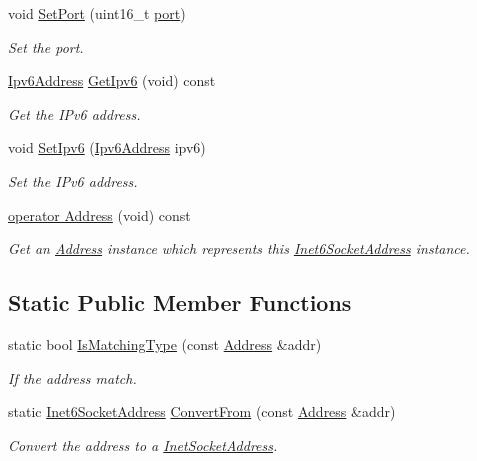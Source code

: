 \begin{DoxyCompactItemize}
void \hyperlink{classns3_1_1Inet6SocketAddress_a1905a8d03d837c043565761556c7cfe5}{Set\+Port} (uint16\+\_\+t \hyperlink{visualizer-ideas_8txt_a21ff1c530daf8435e00048b7fc2c58e3}{port})
\begin{DoxyCompactList}\small\item\em Set the port. \end{DoxyCompactList}\item 
\hyperlink{classns3_1_1Ipv6Address}{Ipv6\+Address} \hyperlink{classns3_1_1Inet6SocketAddress_a19c83458e1e61d5accd19bec5afb254e}{Get\+Ipv6} (void) const 
\begin{DoxyCompactList}\small\item\em Get the I\+Pv6 address. \end{DoxyCompactList}\item 
void \hyperlink{classns3_1_1Inet6SocketAddress_a3ec1c129a8eb5d0fc28d5a627f5d1efd}{Set\+Ipv6} (\hyperlink{classns3_1_1Ipv6Address}{Ipv6\+Address} ipv6)
\begin{DoxyCompactList}\small\item\em Set the I\+Pv6 address. \end{DoxyCompactList}\item 
\hyperlink{classns3_1_1Inet6SocketAddress_a18a0d00148bdb7c3457f9c04828d586e}{operator Address} (void) const 
\begin{DoxyCompactList}\small\item\em Get an \hyperlink{classns3_1_1Address}{Address} instance which represents this \hyperlink{classns3_1_1Inet6SocketAddress}{Inet6\+Socket\+Address} instance. \end{DoxyCompactList}\end{DoxyCompactItemize}
\subsection*{Static Public Member Functions}
\begin{DoxyCompactItemize}
\item 
static bool \hyperlink{classns3_1_1Inet6SocketAddress_a4d928c54affbfb530a12076d6d7e0540}{Is\+Matching\+Type} (const \hyperlink{classns3_1_1Address}{Address} \&addr)
\begin{DoxyCompactList}\small\item\em If the address match. \end{DoxyCompactList}\item 
static \hyperlink{classns3_1_1Inet6SocketAddress}{Inet6\+Socket\+Address} \hyperlink{classns3_1_1Inet6SocketAddress_a2177c66e1bcf17c85dcffb9d2a971f5a}{Convert\+From} (const \hyperlink{classns3_1_1Address}{Address} \&addr)
\begin{DoxyCompactList}\small\item\em Convert the address to a \hyperlink{classns3_1_1InetSocketAddress}{Inet\+Socket\+Address}. \end{DoxyCompactList}\end{DoxyCompactItemize}
